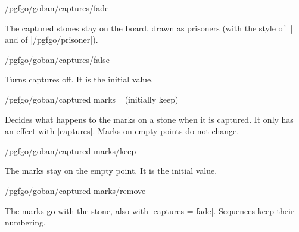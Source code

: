 	\begin{stylekey}{/pgfgo/goban/captures/fade}

		The captured stones stay on the board, drawn as prisoners (with the style of |\prisoner| and of |/pgfgo/prisoner|).

		\begin{codeexample}[]

			\begin{goban}[captures = fade]
			\end{goban}
		\end{codeexample}
	\end{stylekey}

	\begin{stylekey}{/pgfgo/goban/captures/false}

		Turns captures off. It is the initial value.
	\end{stylekey}

	\begin{key}{/pgfgo/goban/captured marks= (initially keep)}

		Decides what happens to the marks on a stone when it is captured. It only has an effect with |captures|. Marks on empty points do not change.

		\begin{codeexample}[]

			\begin{goban}
			\end{goban}

			\begin{goban}[captured marks = remove]
				\stones[b]{B1}
				\marks[triangle]{A1}
			\end{goban}
		\end{codeexample}
	\end{key}

	\begin{stylekey}{/pgfgo/goban/captured marks/keep}

		The marks stay on the empty point. It is the initial value.
	\end{stylekey}

	\begin{stylekey}{/pgfgo/goban/captured marks/remove}

		The marks go with the stone, also with |captures = fade|. Sequences keep their numbering.
	\end{stylekey}

